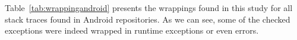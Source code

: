 \documentclass[conference]{IEEEtran}
\begin{document}
Table~\ref{tab:wrappingandroid} presents the wrappings found in this study for all
stack traces found in Android repositories. As we can see, some of the checked
exceptions were indeed wrapped in runtime exceptions or even errors.





\end{document}
